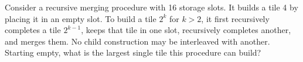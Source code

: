Consider a recursive merging procedure with 16 storage slots. It builds a tile 4 by placing it in an empty slot. To build a tile $2^k$ for $k>2$, it first recursively completes a tile $2^{k-1}$, keeps that tile in one slot, recursively completes another, and merges them. No child construction may be interleaved with another. Starting empty, what is the largest single tile this procedure can build?
